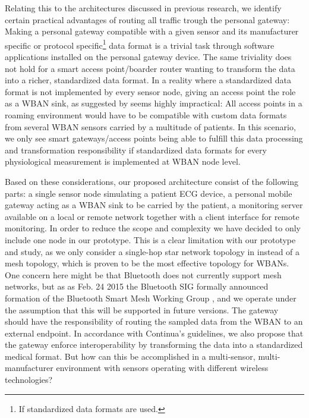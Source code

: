 Relating this to the architectures discussed in previous research, we identify certain practical advantages of routing all traffic trough the personal gateway: Making a personal gateway compatible with a given sensor and its manufacturer specific or protocol specific\footnote{ If standardized data formats are used.} data format is a trivial task through software applications installed on the personal gateway device. The same triviality does not hold for a smart access point/boarder router wanting to transform the data into a richer, standardized data format. In a reality where a standardized data format is not implemented by every sensor node, giving an access point the role as a WBAN sink, as suggested by \cite{DrAmirMohammadRahmani:2014vx} seems highly impractical: All access points in a roaming environment would have to be compatible with custom data formats from several WBAN sensors carried by a multitude of patients. In this scenario, we only see smart gateways/access points being able to fulfill this data processing and transformation responsibility if standardized data formats for every physiological measurement is implemented at WBAN node level.

Based on these considerations, our proposed architecture consist of the following parts: a single sensor node simulating a patient ECG device, a personal mobile gateway acting as a WBAN sink to be carried by the patient, a monitoring server available on a local or remote network together with a client interface for remote monitoring. In order to reduce the scope and complexity we have decided to only include one node in our prototype. This is a clear limitation with our prototype and study, as we only consider a single-hop star network topology in instead of a mesh topology, which is proven to be the most effective topology for WBANs. One concern here might be that Bluetooth does not currently support mesh networks, but as as Feb. 24 2015 the Bluetooth SIG formally announced formation of the Bluetooth Smart Mesh Working Group \cite{bt:sig:mesh}, and we operate under the assumption that this will be supported in future versions. The gateway should have the responsibility of routing the sampled data from the WBAN to an external endpoint. In accordance with Continua's guidelines, we also propose that the gateway enforce interoperability by transforming the data into a standardized medical format. But how can this be accomplished in a multi-sensor, multi-manufacturer environment with sensors operating with different wireless technologies? 

